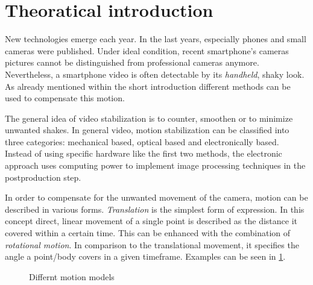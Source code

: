 \section{Theoratical introduction}\label{sec:thintro}
New technologies emerge each year. In the last years, especially phones and small cameras were published. Under ideal condition, recent smartphone's cameras pictures cannot be distinguished from professional cameras anymore. Nevertheless, a smartphone video is often detectable by its \textit{handheld}, shaky look. As already mentioned within the short introduction different methods can be used to compensate this motion.

The general idea of video stabilization is to counter, smoothen or to minimize unwanted shakes. In general video, motion stabilization can be classified into three categories: mechanical based, optical based and electronically based. Instead of using specific hardware like the first two methods, the electronic approach uses computing power to implement image processing techniques in the postproduction step. \cite{blockTang}

In order to compensate for the unwanted movement of the camera, motion can be described in various forms. \textit{Translation} is the simplest form of expression. In this concept direct, linear movement of a single point is described as the distance it covered within a certain time. This can be enhanced with the combination of \textit{rotational motion}.  In comparison to the translational movement, it specifies the angle a point/body covers in a given timeframe. Examples can be seen in \cref{fig:motionmodels}.
\begin{figure}[h!]\centering
    \begin{minipage}{.45\textwidth}\centering
    \end{minipage}
    \begin{minipage}{.45\textwidth}\centering
    \end{minipage}
    \caption{Differnt motion models}
    \label{fig:motionmodels}
\end{figure}

